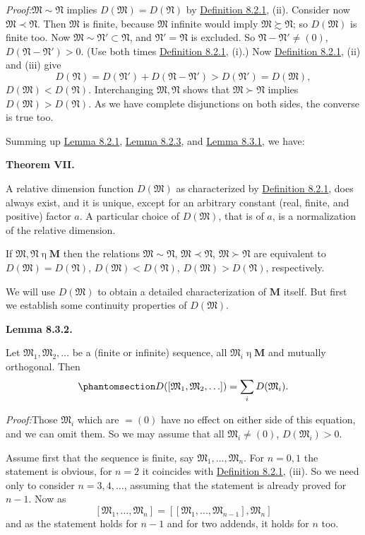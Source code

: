 \documentclass[12pt,b5paper,twoside]{article}
\newcommand{\M}{\mathbf M}
\newcommand{\Lemma}[1]{%
  \par\smallskip\noindent\phantomsection\label{lem:#1}\textbf{Lemma #1.}\enspace
}
\newcommand{\MainTheorem}[1]{%
  \par\smallskip\noindent\phantomsection\label{thm:#1}\textbf{Theorem #1.}\enspace
}
\newcommand{\Proof}{\par\noindent\textit{Proof:}\enspace}
\newcommand{\defref}[1]{\hyperref[def:#1]{Definition #1}}
\newcommand{\lemref}[1]{\hyperref[lem:#1]{Lemma #1}}
\begin{document}
\Proof $\mathfrak M\sim\mathfrak N$ implies
$D(\mathfrak M)=D(\mathfrak N)$ by \defref{8.2.1}, (ii). Consider now
$\mathfrak M\prec\mathfrak N$. Then $\mathfrak M$ is finite, because
$\mathfrak M$ infinite would imply $\mathfrak M\succsim\mathfrak N$; so
$D(\mathfrak M)$ is finite too. Now
$\mathfrak M\sim\mathfrak N'\subset\mathfrak N$, and
$\mathfrak N'=\mathfrak N$ is excluded. So
$\mathfrak N-\mathfrak N'\ne(0)$,
$D(\mathfrak N-\mathfrak N')>0$. (Use both times \defref{8.2.1}, (i).) Now
\defref{8.2.1}, (ii) and (iii) give
\[
 D(\mathfrak N)=D(\mathfrak N')+D(\mathfrak N-\mathfrak N')
 >D(\mathfrak N')=D(\mathfrak M),
\]
$D(\mathfrak M)<D(\mathfrak N)$. Interchanging $\mathfrak M,\mathfrak N$
shows that $\mathfrak M\succ\mathfrak N$ implies
$D(\mathfrak M)>D(\mathfrak N)$. As we have complete disjunctions on both
sides, the converse is true too.

Summing up \lemref{8.2.1}, \lemref{8.2.3}, and \lemref{8.3.1}, we have:

\MainTheorem{VII}
A relative dimension function $D(\mathfrak M)$ as characterized by
\defref{8.2.1}, does always exist, and it is unique, except for an arbitrary
constant (real, finite, and positive) factor $a$. A particular choice of
$D(\mathfrak M)$, that is of $a$, is a normalization of the relative dimension.

If $\mathfrak M,\mathfrak N\mathbin\eta\M$ then the relations
$\mathfrak M\sim\mathfrak N$, $\mathfrak M\prec\mathfrak N$,
$\mathfrak M\succ\mathfrak N$ are equivalent to
$D(\mathfrak M)=D(\mathfrak N)$, $D(\mathfrak M)<D(\mathfrak N)$,
$D(\mathfrak M)>D(\mathfrak N)$, respectively.

We will use $D(\mathfrak M)$ to obtain a detailed characterization of $\M$
itself. But first we establish some continuity properties of $D(\mathfrak M)$.

\Lemma{8.3.2}
Let $\mathfrak M_1,\mathfrak M_2,\ldots$ be a (finite or infinite) sequence,
all $\mathfrak M_i\mathbin\eta\M$ and mutually orthogonal. Then
\begin{equation*}
 \phantomsection\label{eq:8.3.1}
 D([\mathfrak M_1,\mathfrak M_2,\ldots])
 =\sum_iD(\mathfrak M_i).
\end{equation*}

\Proof Those $\mathfrak M_i$ which are $=(0)$ have no effect on either side
of this equation, and we can omit them. So we may assume that all
$\mathfrak M_i\ne(0)$, $D(\mathfrak M_i)>0$.

Assume first that the sequence is finite, say
$\mathfrak M_1,\ldots,\mathfrak M_n$. For $n=0,1$ the statement is obvious,
for $n=2$ it coincides with \defref{8.2.1}, (iii). So we need only to consider
$n=3,4,\ldots$, assuming that the statement is already proved for $n-1$. Now
as
\[
 [\mathfrak M_1,\ldots,\mathfrak M_n]
 =[[\mathfrak M_1,\ldots,\mathfrak M_{n-1}],\mathfrak M_n]
\]
and as the statement holds for $n-1$ and for two addends, it holds for $n$ too.
\end{document}
